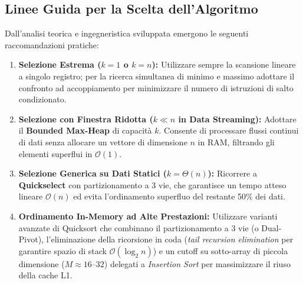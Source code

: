 \subsection{Linee Guida per la Scelta dell'Algoritmo}
Dall'analisi teorica e ingegneristica sviluppata emergono le seguenti raccomandazioni pratiche:
\begin{enumerate}
  \item \textbf{Selezione Estrema ($k = 1$ o $k = n$):} Utilizzare sempre la scansione lineare a singolo registro; per la ricerca simultanea di minimo e massimo adottare il confronto ad accoppiamento per minimizzare il numero di istruzioni di salto condizionato.
  \item \textbf{Selezione con Finestra Ridotta ($k \ll n$ in Data Streaming):} Adottare il \textbf{Bounded Max-Heap} di capacità $k$. Consente di processare flussi continui di dati senza allocare un vettore di dimensione $n$ in RAM, filtrando gli elementi superflui in $\mathcal{O}(1)$.
  \item \textbf{Selezione Generica su Dati Statici ($k = \Theta(n)$):} Ricorrere a \textbf{Quickselect} con partizionamento a 3 vie, che garantisce un tempo atteso lineare $\mathcal{O}(n)$ ed evita l'ordinamento superfluo del restante 50\% dei dati.
  \item \textbf{Ordinamento In-Memory ad Alte Prestazioni:} Utilizzare varianti avanzate di Quicksort che combinano il partizionamento a 3 vie (o Dual-Pivot), l'eliminazione della ricorsione in coda (\textit{tail recursion elimination} per garantire spazio di stack $\mathcal{O}(\log_2 n)$) e un cutoff su sotto-array di piccola dimensione ($M \approx 16$--$32$) delegati a \textit{Insertion Sort} per massimizzare il riuso della cache L1.
\end{enumerate}
